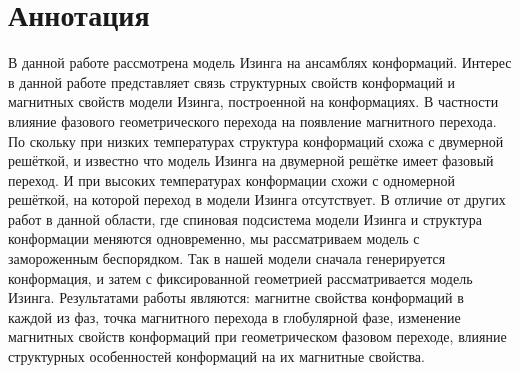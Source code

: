 \section*{Аннотация}
В данной работе рассмотрена модель Изинга на ансамблях конформаций. 
Интерес в данной работе представляет связь структурных свойств конформаций и магнитных свойств модели Изинга, построенной на конформациях. В частности влияние фазового геометрического перехода на появление магнитного перехода. По скольку при низких температурах структура конформаций схожа с двумерной решёткой, и известно что модель Изинга на двумерной решётке имеет фазовый переход. И при высоких температурах конформации схожи с одномерной решёткой, на которой переход в модели Изинга отсутствует.
В отличие от других работ в данной области, где спиновая подсистема модели Изинга и структура конформации меняются одновременно, мы рассматриваем модель с замороженным беспорядком. Так в нашей модели сначала генерируется конформация, и затем с фиксированной геометрией рассматривается модель Изинга.
Результатами работы являются: магнитне свойства конформаций в каждой из фаз, точка магнитного перехода в глобулярной фазе, изменение магнитных свойств конформаций при геометрическом фазовом переходе, влияние структурных особенностей конформаций на их магнитные свойства.